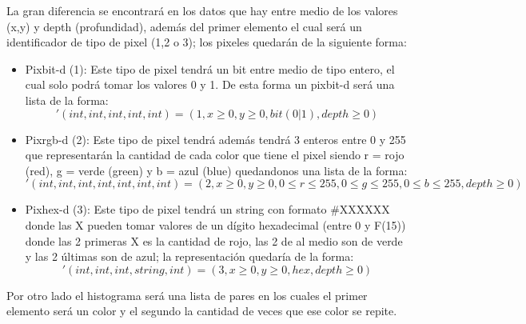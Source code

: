     La gran diferencia se encontrará en los datos que hay entre medio de los valores (x,y) y depth (profundidad), además del primer elemento
    el cual será un identificador de tipo de pixel (1,2 o 3); los pixeles quedarán de la siguiente forma:
    \begin{itemize}
        \item Pixbit-d (1): Este tipo de pixel tendrá un bit entre medio de tipo entero, el cual solo podrá 
        tomar los valores 0 y 1. De esta forma un pixbit-d será una lista de la forma:
        \begin{equation*}
            '(int ,int, int, int, int) = (1, x \geq 0, y \geq 0, bit(0|1), depth \geq 0)
        \end{equation*}
        
        \item Pixrgb-d (2): Este tipo de pixel tendrá además tendrá 3 enteros entre 0 y 255 que representarán la 
        cantidad de cada color que tiene el pixel siendo r = rojo (red), g = verde (green) y b = azul (blue)
        quedandonos una lista de la forma:
        \begin{equation*}
            '(int, int, int, int, int, int, int) = (2, x \geq 0, y \geq 0, 0 \leq r \leq 255, 0 \leq g \leq 255, 0 \leq b \leq 255, depth \geq 0)
        \end{equation*}
        
        \item Pixhex-d (3): Este tipo de pixel tendrá un string con formato \#XXXXXX donde las X pueden tomar valores de un dígito hexadecimal (entre 0 y F(15))
        donde las 2 primeras X es la cantidad de rojo, las 2 de al medio son de verde y las 2 últimas son de azul; la representación quedaría de la forma:
        \begin{equation*}
            '(int, int, int, string, int) = (3, x \geq 0, y \geq 0, hex, depth \geq 0)
        \end{equation*}
    \end{itemize}

    Por otro lado el histograma será una lista de pares en los cuales el primer elemento será un color
    y el segundo la cantidad de veces que ese color se repite.
